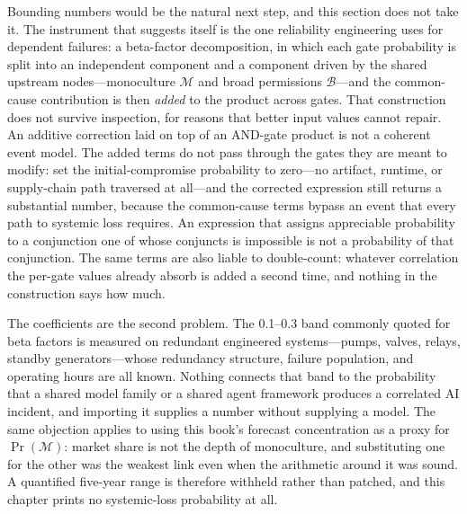 Bounding numbers would be the natural next step, and this section does not take it. The instrument that suggests itself is the one reliability engineering uses for dependent failures: a beta-factor decomposition, in which each gate probability is split into an independent component and a component driven by the shared upstream nodes---monoculture $\mathcal{M}$ and broad permissions $\mathcal{B}$---and the common-cause contribution is then \emph{added} to the product across gates. That construction does not survive inspection, for reasons that better input values cannot repair. An additive correction laid on top of an AND-gate product is not a coherent event model. The added terms do not pass through the gates they are meant to modify: set the initial-compromise probability to zero---no artifact, runtime, or supply-chain path traversed at all---and the corrected expression still returns a substantial number, because the common-cause terms bypass an event that every path to systemic loss requires. An expression that assigns appreciable probability to a conjunction one of whose conjuncts is impossible is not a probability of that conjunction. The same terms are also liable to double-count: whatever correlation the per-gate values already absorb is added a second time, and nothing in the construction says how much.

The coefficients are the second problem. The 0.1--0.3 band commonly quoted for beta factors is measured on redundant engineered systems---pumps, valves, relays, standby generators---whose redundancy structure, failure population, and operating hours are all known. Nothing connects that band to the probability that a shared model family or a shared agent framework produces a correlated AI incident, and importing it supplies a number without supplying a model. The same objection applies to using this book's forecast concentration as a proxy for $\Pr(\mathcal{M})$: market share is not the depth of monoculture, and substituting one for the other was the weakest link even when the arithmetic around it was sound. A quantified five-year range is therefore withheld rather than patched, and this chapter prints no systemic-loss probability at all.

